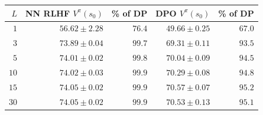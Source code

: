\begin{tabular}{rrrrr}
\hline
$L$ & NN RLHF $V^\pi(s_0)$ & \% of DP & DPO $V^\pi(s_0)$ & \% of DP \\
\hline
$1$ & $56.62 \pm 2.28$ & $76.4$ & $49.66 \pm 0.25$ & $67.0$ \\
$3$ & $73.89 \pm 0.04$ & $99.7$ & $69.31 \pm 0.11$ & $93.5$ \\
$5$ & $74.01 \pm 0.02$ & $99.8$ & $70.04 \pm 0.09$ & $94.5$ \\
$10$ & $74.02 \pm 0.03$ & $99.9$ & $70.29 \pm 0.08$ & $94.8$ \\
$15$ & $74.05 \pm 0.02$ & $99.9$ & $70.57 \pm 0.07$ & $95.2$ \\
$30$ & $74.05 \pm 0.02$ & $99.9$ & $70.53 \pm 0.13$ & $95.1$ \\
\hline
\end{tabular}
